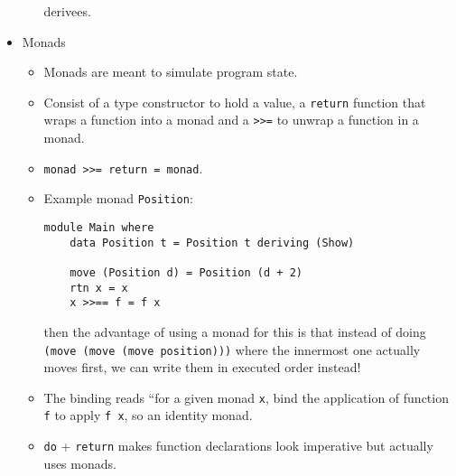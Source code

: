 \documentclass[10pt]{article}
\begin{document}
\begin{itemize}
\begin{itemize}
                derivees.
        \end{itemize}
    \item Monads
        \begin{itemize}
            \item Monads are meant to simulate program state.
            \item Consist of a type constructor to hold a value, a
                \lstinline{return} function that wraps a function into a monad
                and a \lstinline{>>=} to unwrap a function in a monad.
            \item \lstinline{monad >>= return = monad}.
            \item Example monad \lstinline{Position}:
\begin{lstlisting}
module Main where
    data Position t = Position t deriving (Show)

    move (Position d) = Position (d + 2)
    rtn x = x
    x >>== f = f x
\end{lstlisting}
                then the advantage of using a monad for this is that instead of
                doing \lstinline{(move (move (move position)))} where the
                innermost one actually moves first, we can write them in
                executed order instead!
            \item The binding reads ``for a given monad \lstinline{x}, bind the
                application of function \lstinline{f} to apply \lstinline{f x},
                so an identity monad.
            \item \lstinline{do} + \lstinline{return} makes function
                declarations look imperative but actually uses monads.
        \end{itemize}
\end{itemize}
\end{document}
